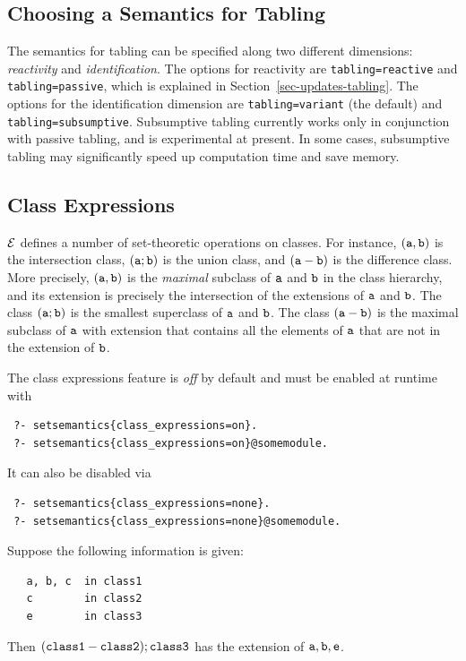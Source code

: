 \documentclass[11pt]{article}
\newcommand{\ERGO}{\mbox{\ensuremath{\cal{E}}\smaller{{\sc{RGO}}}}\xspace}
\newcommand{\FLSYSTEM}{\ERGO}
\begin{document}
\subsection{Choosing a Semantics for Tabling}

The semantics for tabling can be specified along two different dimensions:
\emph{reactivity} and \emph{identification}.
The options for reactivity are \texttt{tabling=reactive} and
\texttt{tabling=passive}, which is explained in
Section~\ref{sec-updates-tabling}.
The options for the identification dimension are
\texttt{tabling=variant} (the default) and \texttt{tabling=subsumptive}.
Subsumptive tabling currently works only in conjunction with passive tabling,
and is experimental at present.  In some cases, subsumptive tabling may
significantly speed up computation time and save memory.


\subsection{Class Expressions}
\label{sec-class-expr}

\FLSYSTEM defines a number of set-theoretic
operations on classes. For instance, $\tt (a,b)$ is the
intersection class, $\tt (a;b)$ is the union class, and $\tt (a-b)$ is
the difference class. More precisely, $\tt (a,b)$ is the \emph{maximal}
subclass of $\tt a$ and $\tt b$ in the class hierarchy, and its extension is
precisely the intersection of the extensions of $\tt a$ and $\tt b$. The class
$\tt (a;b)$ is the smallest superclass of $\tt a$ and $\tt b$. The class $\tt (a-b)$ is the
maximal subclass of $\tt a$ with extension that contains all the elements of
$\tt a$ that are not in the extension of $\tt b$.

The class expressions feature is \emph{off} by default and must be enabled
at runtime with
\begin{verbatim}
 ?- setsemantics{class_expressions=on}.
 ?- setsemantics{class_expressions=on}@somemodule.
\end{verbatim}
It can also be disabled via
\begin{verbatim}
 ?- setsemantics{class_expressions=none}.
 ?- setsemantics{class_expressions=none}@somemodule.
\end{verbatim}

Suppose the following information is given:
\begin{verbatim}
   a, b, c  in class1
   c        in class2
   e        in class3
\end{verbatim}
Then $\tt (class1 - class2) ; class3$ has the extension of $\tt a,b,e$.
\end{document}
